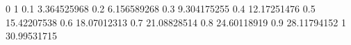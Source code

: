 0    1
0.1  3.364525968
0.2  6.156589268
0.3  9.304175255
0.4  12.17251476
0.5  15.42207538
0.6  18.07012313
0.7  21.08828514
0.8  24.60118919
0.9  28.11794152
1    30.99531715
